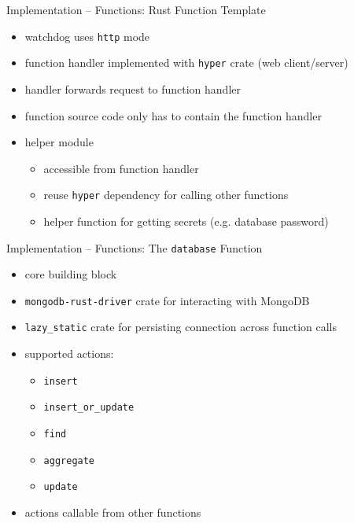 \begin{frame}{Implementation -- Functions: Rust Function Template}
  \begin{itemize}
    \item watchdog uses \texttt{http} mode
    \item function handler implemented with \texttt{hyper} crate (web client/server)
    \item handler forwards request to function handler
    \item function source code only has to contain the function handler
    \item helper module
      \begin{itemize}
        \item accessible from function handler
        \item reuse \texttt{hyper} dependency for calling other functions
        \item helper function for getting secrets (e.g. database password)
      \end{itemize}
  \end{itemize}
\end{frame}

\begin{frame}{Implementation -- Functions: The \texttt{database} Function}
  \begin{itemize}
    \item core building block
    \item \texttt{mongodb-rust-driver} crate for interacting with MongoDB
    \item \texttt{lazy\_static} crate for persisting connection across function calls
    \item supported actions:
      \begin{itemize}
        \item \texttt{insert}
        \item \texttt{insert\_or\_update}
        \item \texttt{find}
        \item \texttt{aggregate}
        \item \texttt{update}
      \end{itemize}
    \item actions callable from other functions
  \end{itemize}
\end{frame}


